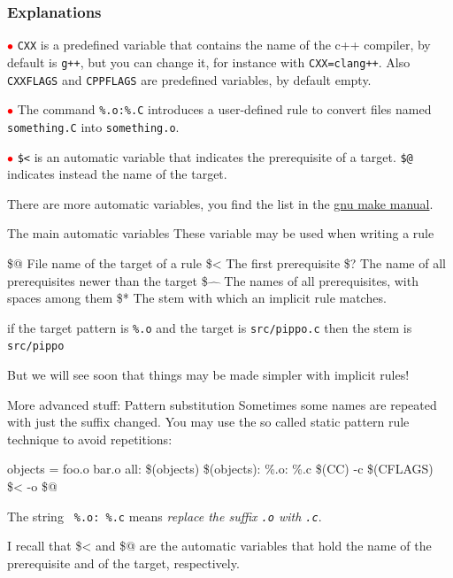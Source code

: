 \documentclass[10pt,aspectratio=169]{beamer}
\begin{document}
\begin{frame}[fragile]
    \frametitle{Explanations}
    \textcolor{red}{$\bullet$} \verb!CXX! is a \alert{predefined variable} that contains the name of the c++ compiler, by default is \texttt{g++}, but you can change it, for instance with \verb!CXX=clang++!.
    Also \texttt{CXXFLAGS} and \texttt{CPPFLAGS} are predefined variables, by default empty.
    \smallskip
    
    \textcolor{red}{$\bullet$} The command \verb!%.o:%.C! introduces a \alert{user-defined rule} to convert files named \texttt{something.C} into \texttt{something.o}.
    \smallskip
    
    \textcolor{red}{$\bullet$} \verb!$<! is an \alert{automatic variable} that indicates the prerequisite of a target. \verb!$@! indicates instead the name of the target.
    \smallskip
    
    There are more automatic variables, you find the list in the \href{https://www.gnu.org/software/make/manual/html_node/Automatic-Variables.html#index-automatic-variables}{gnu make manual}.
\end{frame}

\begin{frame}{The main automatic variables}
    These variable may be used when writing a rule
    \begin{semiverbatim}
        \$@  File name of the target of a rule\newline
        \$<   The first prerequisite\newline
        \$?   The name of all prerequisites newer than the target\newline
        \$\!\!$\hat{\quad}$ The names of all prerequisites, with spaces among
        them\newline
        \$*   The stem with which an \alert{implicit rule} matches.
    \end{semiverbatim}
    if the target pattern is  \texttt{\%.o} and the target is \texttt{src/pippo.c} then the stem is \texttt{src/pippo}
    
    \alert{But we will see soon that things may be made simpler with implicit rules!}
    
  \end{frame}

\begin{frame}{More advanced stuff: Pattern substitution}
Sometimes some names are repeated with just the suffix changed. You may
use the so called \alert{static pattern rule} technique to avoid
repetitions:
\begin{semiverbatim}
objects = foo.o bar.o\newline
all: \$(objects)\newline
\$(objects): \%.o: \%.c\newline
\phantom{xx} \$(CC) -c \$(CFLAGS) \$< -o \$@\newline
\end{semiverbatim}
The string \texttt{ \%.o: \%.c} means \emph{replace the suffix \texttt{.o}
with \texttt{.c}}.

I recall that \alert{\$<} and \alert{\$@} are the \alert{automatic variables} that hold the
name of the prerequisite and of the target, respectively.  
\end{frame}
\end{document}
